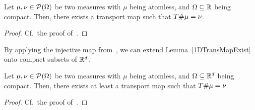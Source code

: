 \begin{lemma}\label{1DTransMapExist}
	Let $\mu, \nu \in \mathcal{P}(\Omega)$ be two measures with $\mu$ being atomless, and $\Omega \subseteq \mathbb{R}$ being compact. Then, there exists a transport map \map[T]{\Omega}{\Omega} such that ${T} \# \mu = \nu$.
\end{lemma}

\begin{proof}
	Cf.~the proof of\ \cite[Lemma~1.27]{San2015}.
\end{proof}



By applying the injective map  from\ {\cite[Lemma~1.29]{San2015}}, we can extend Lemma~\ref{1DTransMapExist} onto compact subsets of $\mathbb{R}^d$.

\begin{theorem}\label{NDTransMapExist}
	Let $\mu, \nu \in \mathcal{P}(\Omega)$ be two measures with $\mu$ being atomless, and $\Omega \subseteq \mathbb{R}^d$ being compact. Then, there exists at least a transport map \map[T]{\Omega}{\Omega} such that ${T} \# \mu = \nu$.
\end{theorem}

\begin{proof}
	Cf.\ the proof of\ \cite[Corollary~1.29]{San2015}.
\end{proof}


